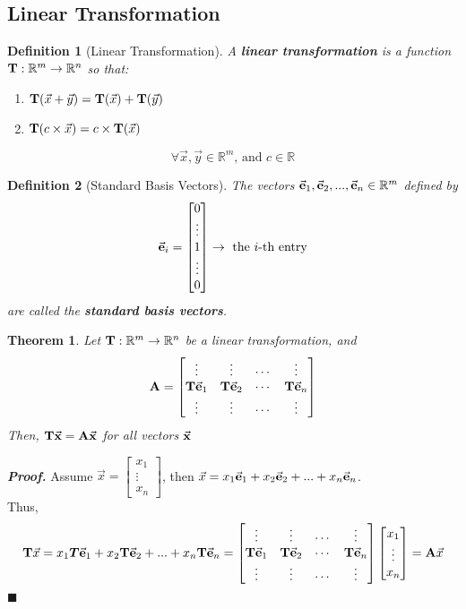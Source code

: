 \documentclass[12pt, a4paper]{article}
\newtheorem{thm}{Theorem}[subsection]
\newtheorem{df}{Definition}[subsection]
\newenvironment*{prf}{\par\indent\textbf{\textit{Proof. }}}{\hfill $\blacksquare$\par}
\def\R{{\mathbb{R}}}
\def\T{{\vb{T}}}
\def\vecx{\va{x}}
\def\vece{\va{e}}
\def\matrixA{\vb{A}}
\begin{document}
\subsection{Linear Transformation}
\begin{df}[Linear Transformation]
A \textbf{linear transformation} is a function $\T: \R^m\rightarrow\R^n$ so that:
\begin{enumerate}
\item $\T(\vec{x}+\vec{y})=\T(\vec{x})+\T(\vec{y})$
\item $\T(c\times \vec{x})=c\times\T(\vec{x})$
\end{enumerate}
$$\forall \vec{x},\vec{y}\in \R^m\text{, and }c\in\R$$
\end{df}

\begin{df}[Standard Basis Vectors]
The vectors $\vece_1,\vece_2,...,\vece_n \in \R^m$ defined by 
$$\vece_i=\begin{bmatrix}0\\\vdots\\1\\\vdots\\0\end{bmatrix} \rightarrow \ \text{the }i\text{-th entry}$$ are called the \textbf{standard basis vectors}.
\end{df}

\begin{thm}
Let $\T: \R^m\rightarrow\R^n$ be a linear transformation, and $$\matrixA=\begin{bmatrix}\vdots&\vdots&\cdots&\vdots\\\T \vece_1&\T \vece_2&\cdots&\T \vece_n\\\vdots&\vdots&\cdots&\vdots\end{bmatrix}$$ Then, $\T\vecx=\matrixA\vecx$ for all vectors $\vecx$
\end{thm}

\begin{prf}
Assume $\vec{x}=\begin{bmatrix}x_1\\\vdots\\x_n\end{bmatrix}$, then $\vec{x}=x_1\vece_1+x_2\vece_2+...+x_n\vece_n$.\\Thus, $$\T\vec{x}=x_1\boldsymbol{T}\vece_1+x_2\T \vece_2+...+x_n\T \vece_n= \begin{bmatrix}\vdots&\vdots&\cdots&\vdots\\\T{\vece_1}&\T{\vece_2}&\cdots&\T{\vece_n}\\\vdots&\vdots&\cdots&\vdots\end{bmatrix}\begin{bmatrix}x_1\\\vdots\\x_n\end{bmatrix}=\matrixA\vec{x}$$
\end{prf}
\end{document}
